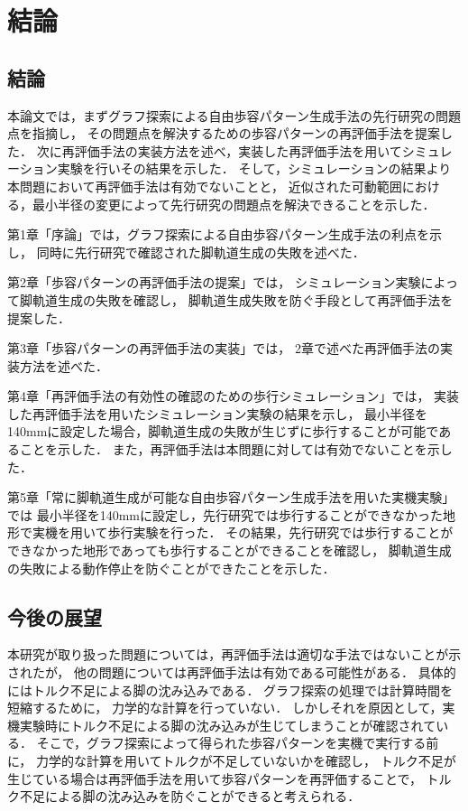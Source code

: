 ﻿

\chapter{結論}\label{chapter:結論}

\section{結論}

本論文では，まずグラフ探索による自由歩容パターン生成手法の先行研究の問題点を指摘し，
その問題点を解決するための歩容パターンの再評価手法を提案した．
次に再評価手法の実装方法を述べ，実装した再評価手法を用いてシミュレーション実験を行いその結果を示した．
そして，シミュレーションの結果より本問題において再評価手法は有効でないことと，
近似された可動範囲における，最小半径の変更によって先行研究の問題点を解決できることを示した．

第1章「序論」では，グラフ探索による自由歩容パターン生成手法の利点を示し，
同時に先行研究で確認された脚軌道生成の失敗を述べた．

第2章「歩容パターンの再評価手法の提案」では，
シミュレーション実験によって脚軌道生成の失敗を確認し，
脚軌道生成失敗を防ぐ手段として再評価手法を提案した．

第3章「歩容パターンの再評価手法の実装」では，
2章で述べた再評価手法の実装方法を述べた．

第4章「再評価手法の有効性の確認のための歩行シミュレーション」では，
実装した再評価手法を用いたシミュレーション実験の結果を示し，
最小半径を140mmに設定した場合，脚軌道生成の失敗が生じずに歩行することが可能であることを示した．
また，再評価手法は本問題に対しては有効でないことを示した．

第5章「常に脚軌道生成が可能な自由歩容パターン生成手法を用いた実機実験」では
最小半径を140mmに設定し，先行研究では歩行することができなかった地形で実機を用いて歩行実験を行った．
その結果，先行研究では歩行することができなかった地形であっても歩行することができることを確認し，
脚軌道生成の失敗による動作停止を防ぐことができたことを示した．

\section{今後の展望}
本研究が取り扱った問題については，再評価手法は適切な手法ではないことが示されたが，
他の問題については再評価手法は有効である可能性がある．
具体的にはトルク不足による脚の沈み込みである．
グラフ探索の処理では計算時間を短縮するために，
力学的な計算を行っていない．
しかしそれを原因として，実機実験時にトルク不足による脚の沈み込みが生じてしまうことが確認されている．
そこで，グラフ探索によって得られた歩容パターンを実機で実行する前に，
力学的な計算を用いてトルクが不足していないかを確認し，
トルク不足が生じている場合は再評価手法を用いて歩容パターンを再評価することで，
トルク不足による脚の沈み込みを防ぐことができると考えられる．

